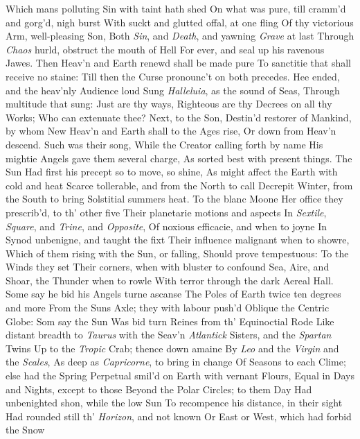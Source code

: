 \documentclass[11pt]{book}
\newcounter {first}
\newcounter {last}
\begin{document}
Which mans polluting Sin with taint hath shed 
On what was pure, till cramm'd and gorg'd, nigh burst 
With suckt and glutted offal, at one fling 
Of thy victorious Arm, well-pleasing Son, 
Both \textit{Sin}, and \textit{Death}, and yawning \textit{Grave} at last 
Through \textit{Chaos} hurld, obstruct the mouth of Hell 
For ever, and seal up his ravenous Jawes. 
Then Heav'n and Earth renewd shall be made pure 
To sanctitie that shall receive no staine: 
Till then the Curse pronounc't on both precedes. 
\quad Hee ended, and the heav'nly Audience loud 
Sung \textit{Halleluia}, as the sound of Seas, 
Through multitude that sung: Just are thy ways, 
Righteous are thy Decrees on all thy Works; 
Who can extenuate thee?  Next, to the Son, 
Destin'd restorer of Mankind, by whom 
New Heav'n and Earth shall to the Ages rise, 
Or down from Heav'n descend.  Such was their song, 
While the Creator calling forth by name 
His mightie Angels gave them several charge, 
As sorted best with present things.  The Sun 
Had first his precept so to move, so shine, 
As might affect the Earth with cold and heat 
Scarce tollerable, and from the North to call 
Decrepit Winter, from the South to bring 
Solstitial summers heat.  To the blanc Moone 
Her office they prescrib'd, to th' other five 
Their planetarie motions and aspects 
In \textit{Sextile}, \textit{Square}, and \textit{Trine}, and \textit{Opposite}, 
Of noxious efficacie, and when to joyne 
In Synod unbenigne, and taught the fixt 
Their influence malignant when to showre, 
Which of them rising with the Sun, or falling, 
Should prove tempestuous: To the Winds they set 
Their corners, when with bluster to confound 
Sea, Aire, and Shoar, the Thunder when to rowle 
With terror through the dark Aereal Hall. 
Some say he bid his Angels turne ascanse 
The Poles of Earth twice ten degrees and more 
From the Suns Axle; they with labour push'd 
Oblique the Centric Globe: Som say the Sun 
Was bid turn Reines from th' Equinoctial Rode 
Like distant breadth to \textit{Taurus} with the Seav'n 
\textit{Atlantick} Sisters, and the \textit{Spartan} Twins 
Up to the \textit{Tropic} Crab; thence down amaine 
By \textit{Leo} and the \textit{Virgin} and the \textit{Scales}, 
As deep as \textit{Capricorne}, to bring in change 
Of Seasons to each Clime; else had the Spring 
Perpetual smil'd on Earth with vernant Flours, 
Equal in Days and Nights, except to those 
Beyond the Polar Circles; to them Day 
Had unbenighted shon, while the low Sun 
To recompence his distance, in their sight 
Had rounded still th' \textit{Horizon}, and not known 
Or East or West, which had forbid the Snow 
\end{document}
